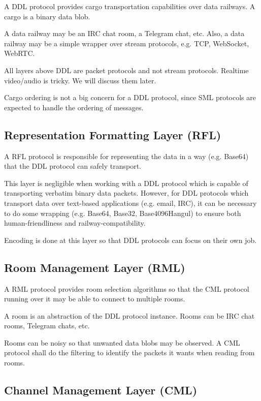 \documentclass[a4paper,11pt]{article}
\begin{document}
A DDL protocol provides cargo transportation capabilities over data railways.
A cargo is a binary data blob.

A data railway may be an IRC chat room, a Telegram chat, etc.
Also, a data railway may be a simple wrapper over stream protocols, e.g. TCP, WebSocket, WebRTC.

All layers above DDL are packet protocols and not stream protocols.
Realtime video/audio is tricky. We will discuss them later.

Cargo ordering is not a big concern for a DDL protocol, since SML protocols are expected to handle the ordering of messages.

\subsection{Representation Formatting Layer (RFL)}

A RFL protocol is responsible for representing the data in a way (e.g. Base64) that the DDL protocol can safely transport.

This layer is negligible when working with a DDL protocol which is capable of transporting verbatim binary data packets.
However, for DDL protocols which transport data over text-based applications (e.g. email, IRC),
it can be necessary to do some wrapping (e.g. Base64, Base32, Base4096Hangul) to ensure both human-friendliness and railway-compatibility.

Encoding is done at this layer so that DDL protocols can focus on their own job.

\subsection{Room Management Layer (RML)}

A RML protocol provides room selection algorithms so that the CML protocol running over it
may be able to connect to multiple rooms.

A room is an abstraction of the DDL protocol instance.
Rooms can be IRC chat rooms, Telegram chats, etc.

Rooms can be noisy so that unwanted data blobs may be observed.
A CML protocol shall do the filtering to identify the packets it wants when reading from rooms.

\subsection{Channel Management Layer (CML)}
\end{document}
